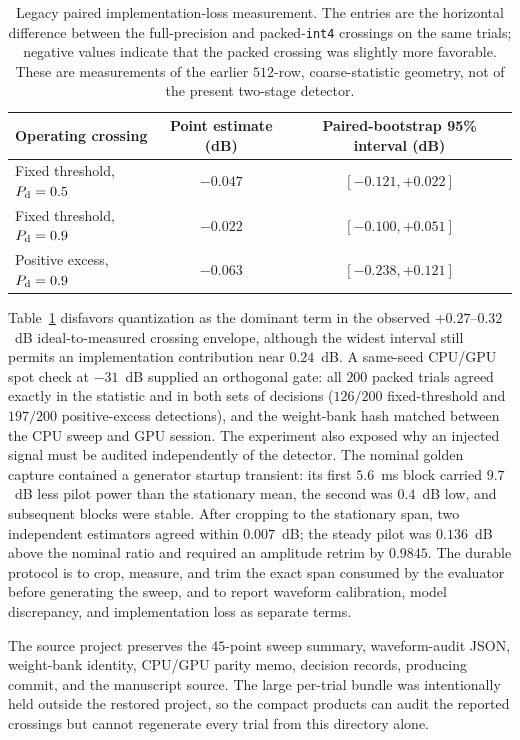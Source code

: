 \begin{table}[H]
\centering
\caption[Legacy paired implementation-loss measurement]{Legacy paired implementation-loss measurement.  The entries are the
horizontal difference between the full-precision and packed-\texttt{int4}
crossings on the same trials; negative values indicate that the packed crossing
was slightly more favorable.  These are measurements of the earlier
$512$-row, coarse-statistic geometry, not of the present two-stage detector.}
\label{tab:impl:legacyloss}
\begin{tabular}{lcc}
\toprule
Operating crossing & Point estimate (dB) & Paired-bootstrap 95\% interval (dB) \\
\midrule
Fixed threshold, $P_{\rm d}=0.5$ & $-0.047$ & $[-0.121,+0.022]$ \\
Fixed threshold, $P_{\rm d}=0.9$ & $-0.022$ & $[-0.100,+0.051]$ \\
Positive excess, $P_{\rm d}=0.9$ & $-0.063$ & $[-0.238,+0.121]$ \\
\bottomrule
\end{tabular}
\end{table}

Table~\ref{tab:impl:legacyloss} disfavors quantization as the dominant term in
the observed $+0.27$--$0.32$~dB ideal-to-measured crossing envelope, although
the widest interval still permits an implementation contribution near
$0.24$~dB.  A same-seed CPU/GPU spot check at $-31$~dB supplied an orthogonal
gate: all $200$ packed trials agreed exactly in the statistic and in both sets
of decisions ($126/200$ fixed-threshold and $197/200$ positive-excess
detections), and the weight-bank hash matched between the CPU sweep and GPU
session.  The experiment also exposed why an injected signal must be audited
independently of the detector.  The nominal golden capture contained a
generator startup transient: its first $5.6$~ms block carried $9.7$~dB less
pilot power than the stationary mean, the second was $0.4$~dB low, and
subsequent blocks were stable.  After cropping to the stationary span, two
independent estimators agreed within $0.007$~dB; the steady pilot was
$0.136$~dB above the nominal ratio and required an amplitude retrim by
$0.9845$.  The durable protocol is to crop, measure, and trim the exact span
consumed by the evaluator before generating the sweep, and to report waveform
calibration, model discrepancy, and implementation loss as separate terms.

The source project preserves the $45$-point sweep summary, waveform-audit JSON,
weight-bank identity, CPU/GPU parity memo, decision records, producing commit,
and the manuscript source.  The large per-trial bundle was intentionally held
outside the restored project, so the compact products can audit the reported
crossings but cannot regenerate every trial from this directory alone.

